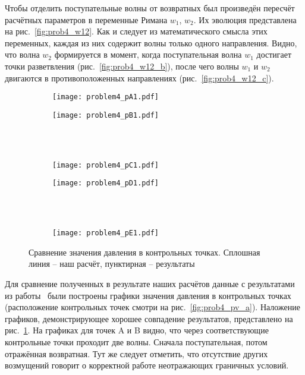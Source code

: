Чтобы отделить поступательные волны от возвратных
был произведён пересчёт расчётных параметров
в переменные Римана $w_1$, $w_2$.
Их эволюция представлена на рис.~\ref{fig:prob4_w12}.
Как и следует из математического смысла этих переменных, каждая
из них содержит волны только одного направления.
Видно, что волна $w_2$ формируется
в момент, когда поступательная волна $w_1$
достигает точки разветвления (рис.~\ref{fig:prob4_w12_b}),
после чего волны $w_1$  и $w_2$ двигаются в противоположенных направлениях (рис.~\ref{fig:prob4_w12_c}).

\begin{figure}[h!]
\begin{subfigure}{0.5\linewidth}\centering
\texttt{[image: problem4\_pA1.pdf]}
\end{subfigure}%
\begin{subfigure}{0.5\linewidth}\centering
\texttt{[image: problem4\_pB1.pdf]}
\end{subfigure} \\
\hfill \\
\begin{subfigure}{0.5\linewidth}\centering
\texttt{[image: problem4\_pC1.pdf]}
\end{subfigure}%
\begin{subfigure}{0.5\linewidth}\centering
\texttt{[image: problem4\_pD1.pdf]}
\end{subfigure}\\
\hfill \\
\begin{subfigure}{0.5\linewidth}\centering
\texttt{[image: problem4\_pE1.pdf]}
\end{subfigure}%
\caption{Сравнение значения давления в контрольных точках. Сплошная линия -- наш расчёт, пунктирная -- результаты~\cite{Xiu:2007}}\label{fig:prob4_pt}
\end{figure}

Для сравнение полученных в результате наших расчётов данные с результатами из работы~\cite{Xiu:2007} 
были построены графики значения давления в контрольных точках (расположение контрольных точек смотри на рис.~\ref{fig:prob4_pv_a}).
Наложение графиков, демонстрирующее хорошее совпадение результатов, представлено на рис.~\ref{fig:prob4_pt}.
На графиках для точек A и B видно, что через соответствующие контрольные точки проходит
две волны. Сначала поступательная, потом отражённая возвратная.
Тут же следует отметить, что отсутствие других возмущений
говорит о корректной работе неотражающих граничных условий.


